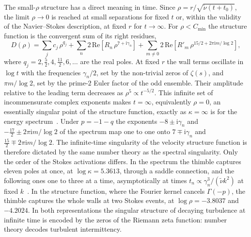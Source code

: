 \documentclass[floatfix,aps,pre,preprint,superscriptaddress,nofootinbib,amsmath,amssymb]{revtex4-2}
\def\I{\mathrm{i}}
\begin{document}
The small-$\rho$ structure has a direct meaning in time. Since $\rho=r/\sqrt{\tilde\nu(t+t_0)}$, the limit $\rho\to0$ is
reached at small separations for fixed $t$ or, within the validity of the Navier--Stokes description, at fixed $r$ for
$t\to\infty$. For $\rho<C_{\min}$ the structure function is the convergent sum of its right residues,
\begin{equation}
    D(\rho)=\sum_j c_j\,\rho^{q_j}+\sum_{n}2\,\mathrm{Re}\left[R_n\,\rho^{7+\I\gamma_n}\right]
    +\sum_{m\ne0}2\,\mathrm{Re}\left[R'_m\,\rho^{15/2+2\pi\I m/\log2}\right],
    \label{eq:smallrho}
\end{equation}
where $q_j=2,\tfrac52,4,\tfrac{11}{2},6,\ldots$ are the real poles. At fixed $r$ the wall terms oscillate in $\log t$ with the
frequencies $\gamma_n/2$, set by the non-trivial zeros of $\zeta(s)$, and $\pi m/\log2$, set by the prime-$2$ Euler factor of the
odd ensemble. Their amplitude relative to the leading term decreases as $\rho^{5}\propto t^{-5/2}$. This infinite set of
incommensurate complex exponents makes $t=\infty$, equivalently $\rho=0$, an essentially singular point of the structure
function, exactly as $\kappa=\infty$ is for the energy spectrum~\cite{migdal2026Riemann}. Under $p=-1-q$ the exponents
$-8\pm\I\gamma_n$ and $-\tfrac{17}{2}\pm2\pi\I m/\log2$ of the spectrum map one to one onto $7\mp\I\gamma_n$ and
$\tfrac{15}{2}\mp2\pi\I m/\log2$. The infinite-time singularity of the velocity structure function is therefore dictated by the
same number theory as the spectral singularity. Only the order of the Stokes activations differs. In the spectrum the thimble
captures eleven poles at once, at $\log\kappa=5.3613$, through a saddle connection, and the following ones one to three at a
time, asymptotically at times $t_n\propto\gamma_n^3/(\tilde\nu k^2)$ at fixed $k$~\cite{migdal2026Riemann}. In the
structure function, where the Fourier kernel cancels $\Gamma(-p)$, the thimble captures the whole walls at two Stokes events,
at $\log\rho=-3.8037$ and $-4.2024$. In both representations the singular structure of decaying turbulence at
infinite time is encoded by the zeros of the Riemann zeta function: number theory decodes turbulent intermittency.
\end{document}
